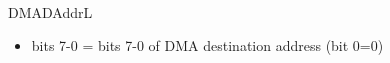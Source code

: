 \\
DMADAddrL
\begin{itemize}
\item bits 7-0 = bits 7-0 of DMA destination address (bit 0=0)
\end{itemize}


